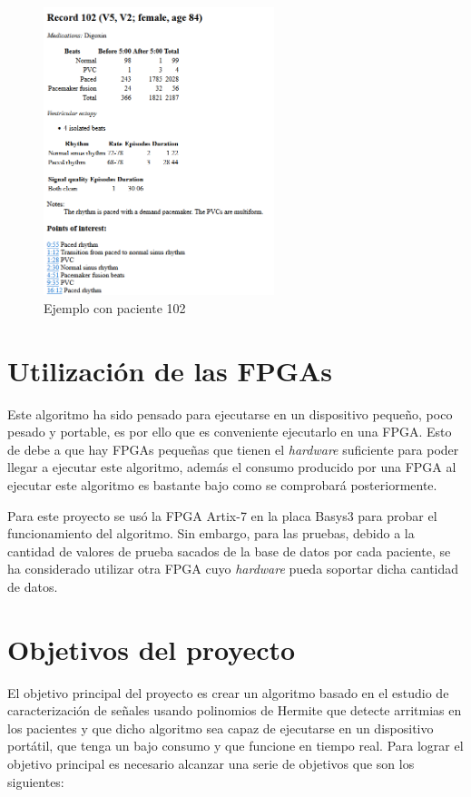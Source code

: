 \begin{figure}[h]
	\centering
	\includegraphics[width=0.6\textwidth]{./Images/img_introduccion/Paciente_pruebas_MIT.png}
	\caption{Ejemplo con paciente 102 \cite{mitdb}}
	\label{fig:Paciente_pruebas_MIT}
\end{figure}

\section{Utilización de las FPGAs}
Este algoritmo ha sido pensado para ejecutarse en un dispositivo pequeño, poco pesado y portable, es por ello que es conveniente ejecutarlo en una FPGA\cite{mdpi_sensors_2014}. Esto de debe a que hay FPGAs pequeñas que tienen el  \textit{hardware}  suficiente para poder llegar a ejecutar este algoritmo, además el consumo producido por una FPGA al ejecutar este algoritmo es bastante bajo como se comprobará posteriormente.

Para este proyecto se usó la FPGA Artix-7 \cite{xilinx_artix7} en la placa Basys3 para probar el funcionamiento del algoritmo. Sin embargo, para las pruebas, debido a la cantidad de valores de prueba sacados de la base de datos por cada paciente, se ha considerado utilizar otra FPGA cuyo  \textit{hardware}  pueda soportar dicha cantidad de datos.


\section{Objetivos del proyecto}

El objetivo principal del proyecto es crear un algoritmo basado en el estudio de caracterización de señales usando polinomios de Hermite \cite{desai2021low} que detecte arritmias en los pacientes y que dicho algoritmo sea capaz de ejecutarse en un dispositivo portátil, que tenga un bajo consumo y que funcione en tiempo real. Para lograr el objetivo principal es necesario alcanzar una serie de objetivos que son los siguientes:

